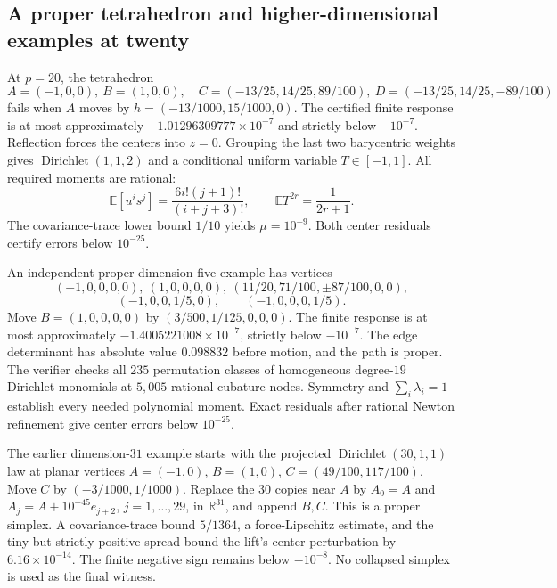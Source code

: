 \documentclass[11pt]{article}
\theoremstyle{definition}
\newcommand{\R}{\mathbb R}
\newcommand{\E}{\mathbb E}
\newcommand{\Dir}{\operatorname{Dirichlet}}
\begin{document}
\subsection{A proper tetrahedron and higher-dimensional examples at twenty}
At $p=20$, the tetrahedron
\[
 A=(-1,0,0),\ B=(1,0,0),\quad
 C=(-13/25,14/25,89/100),\ D=(-13/25,14/25,-89/100)
\]
fails when $A$ moves by $h=(-13/1000,15/1000,0)$.
The certified finite response is at most approximately
$-1.01296309777\times10^{-7}$ and strictly below $-10^{-7}$.
Reflection forces the centers into $z=0$. Grouping the last two barycentric
weights gives $\Dir(1,1,2)$ and a conditional uniform variable $T\in[-1,1]$.
All required moments are rational:
\[
 \E[u^i s^j]=\frac{6i!(j+1)!}{(i+j+3)!},\qquad
 \E T^{2r}=\frac1{2r+1}.
\]
The covariance-trace lower bound $1/10$ yields $\mu=10^{-9}$.
Both center residuals certify errors below $10^{-25}$.

An independent proper dimension-five example has vertices
\[
 (-1,0,0,0,0),\ (1,0,0,0,0),\
 (11/20,71/100,\pm87/100,0,0),
\]
\[
 (-1,0,0,1/5,0),\qquad(-1,0,0,0,1/5).
\]
Move $B=(1,0,0,0,0)$ by $(3/500,1/125,0,0,0)$.
The finite response is at most approximately $-1.4005221008\times10^{-7}$,
strictly below $-10^{-7}$. The edge determinant has absolute value
$0.098832$ before motion, and the path is proper. The verifier checks
all $235$ permutation classes of homogeneous degree-$19$ Dirichlet
monomials at $5{,}005$ rational cubature nodes. Symmetry and
$\sum_i\lambda_i=1$ establish every needed polynomial moment. Exact
residuals after rational Newton refinement give center errors below
$10^{-25}$.

The earlier dimension-$31$ example starts with the projected
$\Dir(30,1,1)$ law at planar vertices
$A=(-1,0)$, $B=(1,0)$, $C=(49/100,117/100)$.
Move $C$ by $(-3/1000,1/1000)$. Replace the $30$ copies near $A$ by
$A_0=A$ and $A_j=A+10^{-45}e_{j+2}$, $j=1,\ldots,29$, in $\R^{31}$,
and append $B,C$. This is a proper simplex. A covariance-trace bound
$5/1364$, a force-Lipschitz estimate, and the tiny but strictly positive
spread bound the lift's center perturbation by $6.16\times10^{-14}$.
The finite negative sign remains below $-10^{-8}$. No collapsed simplex
is used as the final witness.
\end{document}
